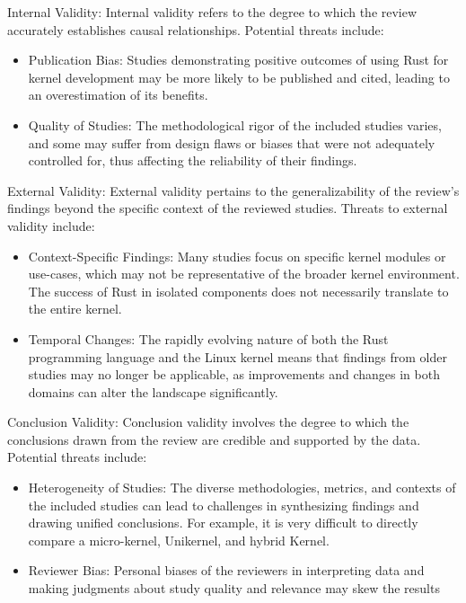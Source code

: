 \documentclass[sigconf,review,anonymous]{acmart}
\begin{document}
Internal Validity: Internal validity refers to the degree to which the review accurately establishes
causal relationships. Potential threats include:

\begin{itemize}
  \item Publication Bias: Studies demonstrating positive outcomes of using Rust for kernel
    development may be more likely to be published and cited, leading to an overestimation of its
    benefits.
  \item Quality of Studies: The methodological rigor of the included studies varies, and some may
    suffer from design flaws or biases that were not adequately controlled for, thus affecting the
    reliability of their findings.
\end{itemize}

External Validity: External validity pertains to the generalizability of the review's findings
beyond the specific context of the reviewed studies. Threats to external validity include:

\begin{itemize}
  \item Context-Specific Findings: Many studies focus on specific kernel modules or use-cases, which
    may not be representative of the broader kernel environment. The success of Rust in isolated
    components does not necessarily translate to the entire kernel.
  \item Temporal Changes: The rapidly evolving nature of both the Rust programming language and the
    Linux kernel means that findings from older studies may no longer be applicable, as improvements
    and changes in both domains can alter the landscape significantly.
\end{itemize}


Conclusion Validity: Conclusion validity involves the degree to which the conclusions drawn from the
review are credible and supported by the data. Potential threats include:

\begin{itemize}
  \item Heterogeneity of Studies: The diverse methodologies, metrics, and contexts of the included studies
    can lead to challenges in synthesizing findings and drawing unified conclusions. For example, it
    is very difficult to directly compare a micro-kernel, Unikernel, and hybrid Kernel.
  \item Reviewer Bias: Personal biases of the reviewers in interpreting data and making judgments
    about study quality and relevance may skew the results
\end{itemize}
\end{document}
